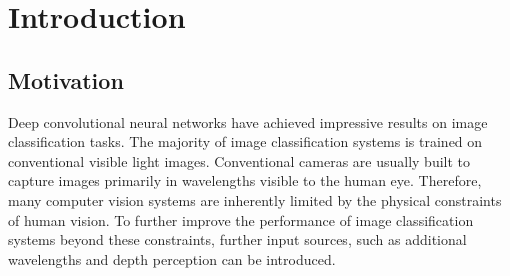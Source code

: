 \documentclass{l4proj}
\begin{document}
%
%
%
%
%
%
%
\chapter{Introduction}




\section{Motivation}

Deep convolutional neural networks have achieved impressive results on image classification tasks. The majority of image classification systems is trained on conventional visible light images. Conventional cameras are usually built to capture images primarily in wavelengths visible to the human eye. Therefore, many computer vision systems are inherently limited by the physical constraints of human vision. To further improve the performance of image classification systems beyond these constraints, further input sources, such as additional wavelengths and depth perception can be introduced.
\end{document}
